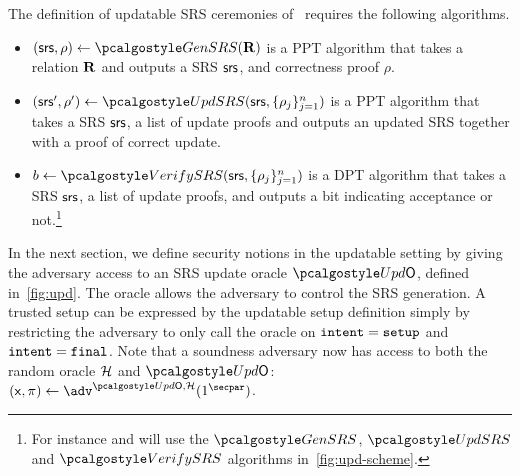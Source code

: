 The definition of updatable SRS ceremonies of~\cite{C:GKMMM18} requires the following algorithms.

\begin{itemize} 
	\item
	$(\srs,\rho) \gets \kgen(\REL)$ is a PPT algorithm that takes a relation $\mathbf{R}$ and outputs a SRS $\mathsf{srs}$, and correctness proof $\rho$.
	\item
	$ (\srs',\rho') \gets \upd(\srs, \{\rho_j \}_{j=1}^n)$ is a PPT algorithm that takes a SRS $\mathsf{srs}$, a list of update proofs and outputs an updated SRS together with a proof of correct update. 
	\item
	$b \gets \verifyCRS(\srs, \{\rho_j \}_{j=1}^n)$ is a DPT algorithm that takes a SRS $\mathsf{srs}$, a list of update proofs, and outputs a bit indicating acceptance or not.\footnote{For instance \plonk{} and \marlin{} will use the $\kgen$, $\upd$ and $\verifyCRS$ algorithms in~\cref{fig:upd-scheme}.}
\end{itemize}


In the next section, we define security notions in the updatable setting by giving the adversary access to an SRS update oracle $\initU$, defined in~\cref{fig:upd}. The oracle allows the adversary to control the SRS generation. A trusted setup can be expressed by the updatable setup definition simply by restricting the adversary to only call the oracle on $\mathtt{intent} = \mathtt{setup}$ and $\mathtt{intent} = \mathtt{final}$. Note that a soundness adversary now has access to both the random oracle $\mathcal{H}$ and $\initU$:  $(\inp, \zkproof) \gets \adv^{\initU,\ro}(1^\secpar)$. %

\newcommand*{\Scale}[2][4]{\scalebox{#1}{$#2$}}%

